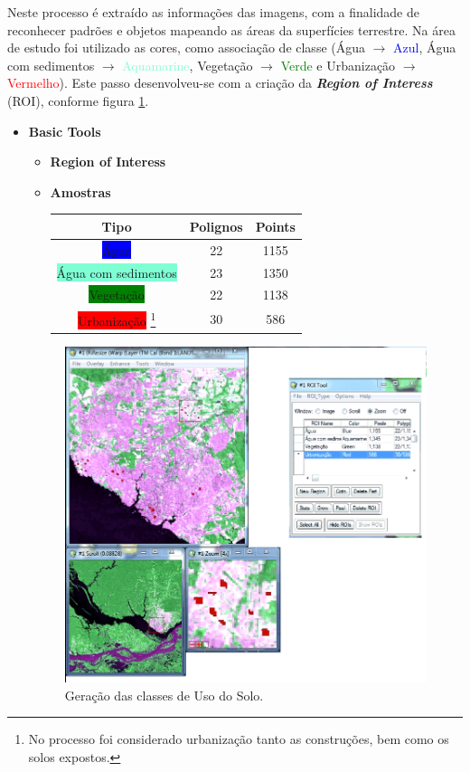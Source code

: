 \hspace{1.5cm}
Neste processo é extraído  as informações das imagens, com a finalidade de reconhecer padrões e objetos mapeando as áreas da superfícies terrestre. Na área de estudo foi utilizado as cores, como associação de classe (Água $\rightarrow$ \textcolor{blue}{Azul}, Água com sedimentos $\rightarrow$ \textcolor{aquamarine}{Aquamarine}, Vegetação $\rightarrow$ \textcolor{green}{Verde} e Urbanização $\rightarrow$ \textcolor{red}{Vermelho}). Este passo desenvolveu-se com a criação da \textbf{\textit{Region of Interess}} (ROI), conforme figura \ref{roi01}.
\begin{itemize}
\item \textbf{Basic Tools}
\begin{itemize}
\item \textbf{Region of Interess}\\
\item \textbf{Amostras}\\
\begin{tabular}{|c|c|c|}
\hline
Tipo & Polignos & Points\\
\hline
\colorbox{blue}{Água} & 22 & 1155 \\
\hline
\colorbox{aquamarine}{Água com sedimentos} & 23&1350\\
\hline
\colorbox{green}{Vegetação} & 22&1138\\
\hline
\colorbox{red}{Urbanização} \footnote{No processo foi considerado urbanização tanto as construções, bem como os solos expostos.} & 30&586\\
\hline
\end{tabular}
\end{itemize}
\begin{figure}[!htpb]
        \centering
        \includegraphics[scale =0.5]{imagens/roi01a.png}
        \caption{Geração das classes de Uso do Solo.}
        \label{roi01}
\end{figure}
\end{itemize}
